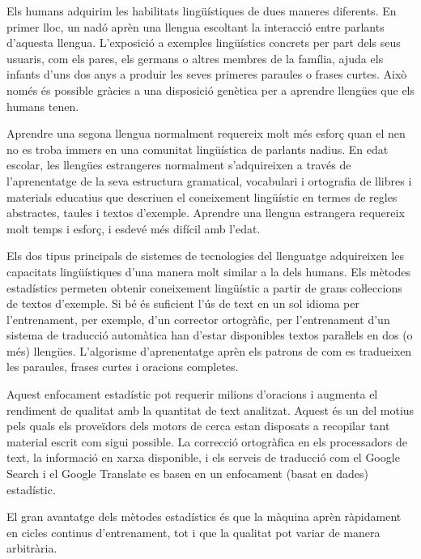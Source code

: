\begin{multicols}{2}
Els humans adquirim les habilitats lingüístiques de dues maneres diferents. En primer lloc, un nadó aprèn una llengua escoltant la interacció entre parlants d’aquesta llengua. L’exposició a exemples lingüístics concrets per part dels seus usuaris, com els pares, els germans o altres membres de la família, ajuda els infants d’uns dos anys a produir les seves primeres paraules o frases curtes. Això només és possible gràcies a una disposició genètica per a aprendre llengües que els humans tenen.

Aprendre una segona llengua normalment requereix molt més esforç quan el nen no es troba immers en una comunitat lingüística de parlants nadius. En edat escolar, les llengües estrangeres normalment s’adquireixen a través de l’aprenentatge de la seva estructura gramatical, vocabulari i ortografia de llibres i materials educatius que descriuen el coneixement lingüístic en termes de regles abstractes, taules i textos d’exemple. Aprendre una llengua estrangera requereix molt temps i esforç, i esdevé més difícil amb l’edat.


Els dos tipus principals de sistemes de tecnologies del llenguatge adquireixen les capacitats lingüístiques d’una manera molt similar a la dels humans. Els mètodes estadístics permeten obtenir coneixement lingüístic a partir de grans coŀleccions de textos d’exemple. Si bé és suficient l'ús de text en un sol idioma per l’entrenament, per exemple, d'un corrector ortogràfic, per l’entrenament d'un sistema de traducció automàtica han d'estar disponibles textos paraŀlels en dos (o més) llengües. L'algorisme d'aprenentatge aprèn els patrons de com es tradueixen les paraules, frases curtes i oracions completes.

Aquest enfocament estadístic pot requerir milions d'oracions i augmenta el rendiment de qualitat amb la quantitat de text analitzat. Aquest és un del motius pels quals els proveïdors dels motors de cerca estan disposats a recopilar tant material escrit com sigui possible. La correcció ortogràfica en els processadors de text, la informació en xarxa disponible, i els serveis de traducció com el Google Search i el Google Translate es basen en un enfocament (basat en dades) estadístic.   

El gran avantatge dels mètodes estadístics és que la màquina aprèn ràpidament en cicles continus d’entrenament, tot i que la qualitat pot variar de manera arbitrària.


\end{multicols}
